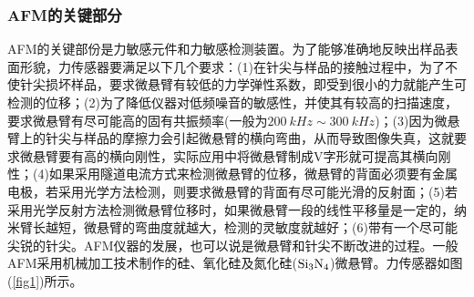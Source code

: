 \documentclass[a4paper]{article}
\begin{document}
\subsubsection{AFM的关键部分}
AFM的关键部份是力敏感元件和力敏感检测装置。为了能够准确地反映出样品表面形貌，力传感器要满足以下几个要求：(1)在针尖与样品的接触过程中，为了不使针尖损坏样品，要求微悬臂有较低的力学弹性系数，即受到很小的力就能产生可检测的位移；(2)为了降低仪器对低频噪音的敏感性，并使其有较高的扫描速度，要求微悬臂有尽可能高的固有共振频率(一般为$\SI{200}{kHz}\sim\SI{300}{kHz}$)；(3)因为微悬臂上的针尖与样品的摩擦力会引起微悬臂的横向弯曲，从而导致图像失真，这就要求微悬臂要有高的横向刚性，实际应用中将微悬臂制成V字形就可提高其横向刚性；(4)如果采用隧道电流方式来检测微悬臂的位移，微悬臂的背面必须要有金属电极，若采用光学方法检测，则要求微悬臂的背面有尽可能光滑的反射面；(5)若采用光学反射方法检测微悬臂位移时，如果微悬臂一段的线性平移量是一定的，纳米臂长越短，微悬臂的弯曲度就越大，检测的灵敏度就越好；(6)带有一个尽可能尖锐的针尖。AFM仪器的发展，也可以说是微悬臂和针尖不断改进的过程。一般AFM采用机械加工技术制作的硅、氧化硅及氮化硅($ \ce{Si_3N_4} $)微悬臂。力传感器如图(\ref{fig1})所示。
\end{document}
